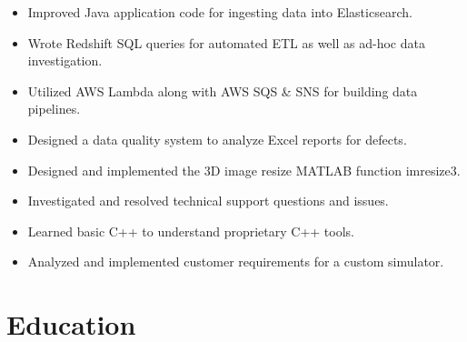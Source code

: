 \documentclass[letterpaper]{resume}
\begin{document}
\begin{minipage}[t]{0.72\textwidth}

\begin{itemize}
\item Improved Java application code for ingesting data into Elasticsearch.
\item Wrote Redshift SQL queries for automated ETL as well as ad-hoc data investigation.
\item Utilized AWS Lambda along with AWS SQS \& SNS for building data pipelines.
\item Designed a data quality system to analyze Excel reports for defects.
\end{itemize}

\sectionspace %


\begin{itemize}
\item Designed and implemented the 3D image resize MATLAB function imresize3.
\item Investigated and resolved technical support questions and issues.
\end{itemize}

\sectionspace %


\begin{itemize}
\item Learned basic C++ to understand proprietary C++ tools.
\item Analyzed and implemented customer requirements for a custom simulator.
\end{itemize}

\sectionspace %


\section{Education}


\end{minipage}
\end{document}
